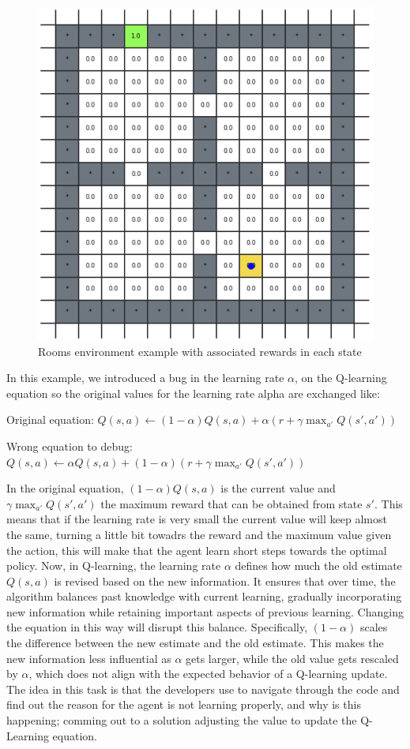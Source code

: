 \begin{figure}[h]
  \centering
  \includegraphics[width=0.5\columnwidth]{figures/rooms.png}
  \caption{Rooms environment example with associated rewards in each state}
  \label{fig:rooms}
\end{figure}

In this example, we introduced a bug in the learning rate $\alpha$, on the Q-learning equation 
so the original values for the learning rate alpha are exchanged like:

Original equation:
$
Q(s, a) \leftarrow (1-\alpha) Q(s, a) + \alpha \left( r + \gamma \max_{a'} Q(s', a') \right)
$

Wrong equation to debug:
$
Q(s, a) \leftarrow  \alpha Q(s, a) + (1-\alpha) \left( r + \gamma \max_{a'} Q(s', a') \right)
$

In the original equation,  $(1-\alpha) Q(s, a)$ is the current value and $\gamma \max_{a'} Q(s', a')$ 
the maximum reward that can be obtained from state $s'$. This means that if the learning rate is very 
small the current value will keep almost the same, turning a little bit towadrs the reward and the 
maximum value given the action, this will make that the agent learn short steps towards the 
optimal policy. Now, in Q-learning, the learning rate $\alpha$ defines how much the old estimate $Q(s,a)$ 
is revised based on the new information. It ensures that over time, the algorithm balances past 
knowledge with current learning, gradually incorporating new information while retaining important 
aspects of previous learning. Changing the equation in this way will disrupt this balance. Specifically,
$(1-\alpha)$ scales the difference between the new estimate and the old estimate. This makes the new 
information less influential as $\alpha$ gets larger, while the old value gets rescaled by $\alpha$, 
which does not align with the expected behavior of a Q-learning update. The idea in this task is that 
the developers use \flik to navigate through the code and find out the reason for the agent is not 
learning properly, and why is this happening; comming out to a solution adjusting the value to update the 
Q-Learning equation.

